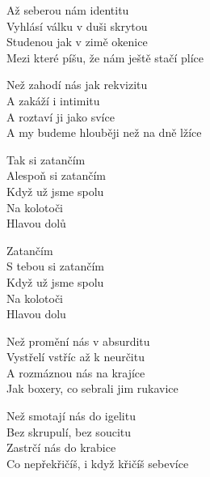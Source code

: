 
\ve{}
Až seberou nám identitu\\
Vyhlásí válku v duši skrytou\\
Studenou jak v zimě okenice\\
Mezi které píšu, že nám ještě stačí plíce

\ve{}
Než zahodí nás jak rekvizitu\\
A zakáží i intimitu\\
A roztaví ji jako svíce\\
A my budeme hlouběji než na dně lžíce

\cho{}
Tak si  zatančím\\
Alespoň si zatančím\\
Když už jsme spolu\\
Na  kolotoči\\
Hlavou dolů

Zatančím\\
S tebou si  zatančím\\
Když už jsme spolu\\
Na kolotoči\\
Hlavou dolu

\ve{}
Než promění nás v absurditu\\
Vystřelí vstříc až k neurčitu\\
A rozmáznou nás na krajíce\\
Jak boxery, co sebrali jim rukavice

\ve{}
Než smotají nás do igelitu\\
Bez skrupulí, bez soucitu\\
Zastrčí nás do krabice\\
Co nepřekřičíš, i když křičíš sebevíce


\esong{}